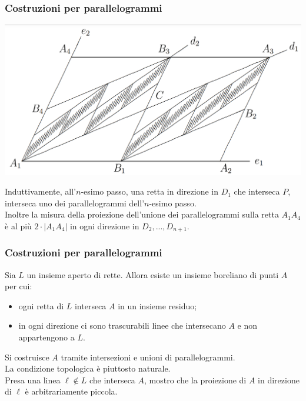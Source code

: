 \documentclass[11pt]{beamer} %
\newcommand{\<}{\langle}
\renewcommand{\>}{\rangle}
\theoremstyle{theorem}
\theoremstyle{theorem}
\theoremstyle{theorem}
\theoremstyle{theorem}
\theoremstyle{theorem}
\begin{document}
\begin{frame}[fragile]
	\frametitle{Costruzioni per parallelogrammi}
	
	\begin{center}
	\includegraphics[width=0.5\columnwidth]{passi123.png}
	\end{center}

	Induttivamente, all'$n$-esimo passo, una retta in direzione in $D_1$ che interseca $P$, interseca uno dei parallelogrammi dell'$n$-esimo passo.\\
	Inoltre la misura della proiezione dell'unione dei parallelogrammi 
	sulla retta $A_{1} A_{4}$ è al più $2 \cdot\left|A_{1} A_{4}\right|$ in ogni direzione in $D_2,...,D_{n+1}$.\\

\end{frame}



\begin{frame}
	\frametitle{Costruzioni per parallelogrammi}
	\begin{lemma}{2}
		Sia $L$ un insieme aperto di rette. Allora esiste un insieme boreliano di punti $A$ per cui:\\
		\begin{itemize}
			\item ogni retta di $L$ interseca $A$ in un insieme residuo;\\
			\item in ogni direzione ci sono trascurabili linee che intersecano $A$ e non appartengono a $L$.\\
		\end{itemize}
	\end{lemma}
	
	\pause
	Si costruisce $A$ tramite intersezioni e unioni di parallelogrammi.\\ \pause
	La condizione topologica è piuttosto naturale.\\ \pause
	Presa una linea $\ell \not \in L$ che interseca $A$, mostro che la proiezione di $A$ in direzione di $\ell$ è arbitrariamente piccola.
	
	
\end{frame}	
\end{document}
